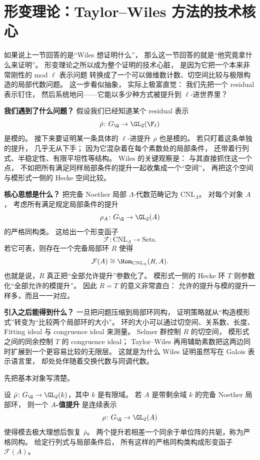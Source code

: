 \section{形变理论：Taylor--Wiles 方法的技术核心}
\label{sec:ch10-deformation}

\providecommand{\rhobar}{\bar{\rho}}

如果说上一节回答的是“Wiles 想证明什么”，
那么这一节回答的就是“他究竟拿什么来证明”。
形变理论之所以成为整个证明的技术心脏，
是因为它把一个本来非常刚性的 mod $\ell$ 表示问题
转换成了一个可以做维数计数、切空间比较与极限构造的局部代数问题。
这一步看似抽象，
实际上极富直觉：
我们先把一个 residual 表示钉住，
然后系统地问——它能以多少种方式被提升到 $\ell$-进世界里？

\textbf{我们遇到了什么问题？}
假设我们已经知道某个 residual 表示
\[
  \rhobar\colon G_\Q\to \GL_2(\F_\ell)
\]
是模的。
接下来要证明某一条具体的 $\ell$-进提升 $\rho$ 也是模的。
若只盯着这条单独的提升，
几乎无从下手；
因为它混杂着在每个素数处的局部条件，
还带着行列式、半稳定性、有限平坦性等结构。
Wiles 的关键观察是：
与其直接抓住这一个点，
不如把所有满足同样局部条件的提升一起收集成一个“空间”，
再把这个空间与模形式一侧的 Hecke 空间比较。

\textbf{核心思想是什么？}
把完备 Noether 局部 $\Lambda$-代数范畴记为 $\mathrm{CNL}_\Lambda$。
对每个对象 $A$，
考虑所有满足规定局部条件的提升
\[
  \rho_A\colon G_\Q\to \GL_2(A)
\]
的严格同构类。
这给出一个形变函子
\[
  \mathcal F\colon \mathrm{CNL}_\Lambda\to \mathrm{Sets}.
\]
若它可表，则存在一个完备局部环 $R$ 使得
\[
  \mathcal F(A)\cong \Hom_{\mathrm{CNL}_\Lambda}(R,A).
\]
也就是说，$R$ 真正把“全部允许提升”参数化了。
模形式一侧的 Hecke 环 $T$ 则参数化“全部允许的模提升”。
因此 $R=T$ 的意义非常直白：
允许的提升与模的提升一样多，而且一一对应。

\textbf{引入之后能得到什么？}
一旦把问题压缩到局部环同构，
证明策略就从“构造模形式”转变为“比较两个局部环的大小”。
环的大小可以通过切空间、关系数、长度、Fitting ideal 与 congruence ideal 来测量。
Selmer 群控制 $R$ 的切空间，
模形式之间的同余控制 $T$ 的 congruence ideal；
Taylor--Wiles 再用辅助素数把这两边同时扩展到一个更容易比较的无限层。
这就是为什么 Wiles 证明虽然写在 Galois 表示语言里，
却处处伴随着交换代数与同调代数。



先把基本对象写清楚。

\begin{definition}[形变问题]
设 $\rhobar\colon G_\Q\to \GL_2(k)$，其中 $k$ 是有限域。
若 $A$ 是带剩余域 $k$ 的完备 Noether 局部环，
则一个 \textbf{$A$-值提升} 是连续表示
\[
  \rho\colon G_\Q\to \GL_2(A)
\]
使得模去极大理想后恢复 $\rhobar$。
两个提升若相差一个同余于单位阵的共轭，称为严格同构。
给定行列式与局部条件后，
所有这样的严格同构类构成形变函子 $\mathcal F(A)$。
\end{definition}

